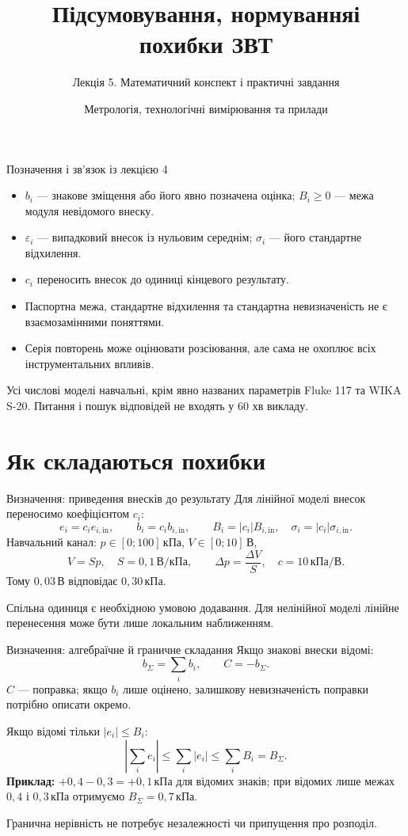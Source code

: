 \documentclass[aspectratio=169,11pt]{beamer}
\title{Підсумовування, нормування\newline і похибки ЗВТ}
\subtitle{Лекція 5. Математичний конспект і практичні завдання}
\author{Метрологія, технологічні вимірювання та прилади}
\date{}
\newcommand{\unit}[1]{\,\text{#1}}
\begin{document}
\begin{frame}\titlepage\end{frame}

\begin{frame}{Позначення і зв’язок із лекцією 4}
\begin{itemize}
\item $b_i$ — знакове зміщення або його явно позначена оцінка; $B_i\ge0$ — межа модуля невідомого внеску.
\item $\varepsilon_i$ — випадковий внесок із нульовим середнім; $\sigma_i$ — його стандартне відхилення.
\item $c_i$ переносить внесок до одиниці кінцевого результату.
\item Паспортна межа, стандартне відхилення та стандартна невизначеність не є взаємозамінними поняттями.
\item Серія повторень може оцінювати розсіювання, але сама не охоплює всіх інструментальних впливів.
\end{itemize}
Усі числові моделі навчальні, крім явно названих параметрів Fluke 117 та WIKA S-20. Питання і пошук відповідей не входять у 60 хв викладу.
\end{frame}

\section{Як складаються похибки}
\begin{frame}{Визначення: приведення внесків до результату}
Для лінійної моделі внесок переносимо коефіцієнтом $c_i$:
\[
e_i=c_i e_{i,\mathrm{in}},\qquad b_i=c_i b_{i,\mathrm{in}},\qquad
B_i=|c_i|B_{i,\mathrm{in}},\quad \sigma_i=|c_i|\sigma_{i,\mathrm{in}}.
\]
Навчальний канал: $p\in[0;100]\unit{кПа}$, $V\in[0;10]\unit{В}$,
\[
V=Sp,\quad S=0{,}1\unit{В/кПа},\qquad
\Delta p=\frac{\Delta V}{S},\quad c=10\unit{кПа/В}.
\]
Тому $0{,}03\unit{В}$ відповідає $0{,}30\unit{кПа}$.
\medskip

Спільна одиниця є необхідною умовою додавання. Для нелінійної моделі лінійне перенесення може бути лише локальним наближенням.
\end{frame}

\begin{frame}{Визначення: алгебраїчне й граничне складання}
Якщо знакові внески відомі:
\[
b_\Sigma=\sum_i b_i,\qquad C=-b_\Sigma.
\]
$C$ — поправка; якщо $b_i$ лише оцінено, залишкову невизначеність поправки потрібно описати окремо.
\medskip

Якщо відомі тільки $|e_i|\le B_i$:
\[
\left|\sum_i e_i\right|\le\sum_i|e_i|\le\sum_iB_i=B_\Sigma.
\]
\textbf{Приклад:} $+0{,}4-0{,}3=+0{,}1\unit{кПа}$ для відомих знаків; при відомих лише межах $0{,}4$ і $0{,}3\unit{кПа}$ отримуємо $B_\Sigma=0{,}7\unit{кПа}$.
\medskip

Гранична нерівність не потребує незалежності чи припущення про розподіл.
\end{frame}
\end{document}
